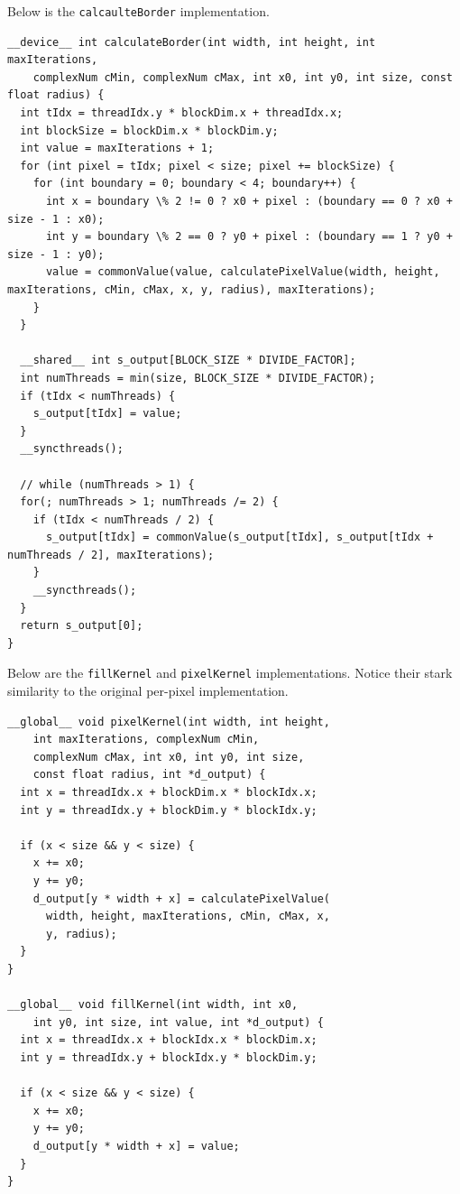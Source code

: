 \documentclass[letterpaper]{article}
\begin{document}
\begin{multicols}{2}
Below is the \texttt{calcaulteBorder} implementation.

\begin{lstlisting}
__device__ int calculateBorder(int width, int height, int maxIterations,
    complexNum cMin, complexNum cMax, int x0, int y0, int size, const float radius) {
  int tIdx = threadIdx.y * blockDim.x + threadIdx.x;
  int blockSize = blockDim.x * blockDim.y;
  int value = maxIterations + 1;
  for (int pixel = tIdx; pixel < size; pixel += blockSize) {
    for (int boundary = 0; boundary < 4; boundary++) {
      int x = boundary \% 2 != 0 ? x0 + pixel : (boundary == 0 ? x0 + size - 1 : x0); 
      int y = boundary \% 2 == 0 ? y0 + pixel : (boundary == 1 ? y0 + size - 1 : y0);
      value = commonValue(value, calculatePixelValue(width, height, maxIterations, cMin, cMax, x, y, radius), maxIterations);
    }
  }

  __shared__ int s_output[BLOCK_SIZE * DIVIDE_FACTOR];
  int numThreads = min(size, BLOCK_SIZE * DIVIDE_FACTOR);
  if (tIdx < numThreads) {
    s_output[tIdx] = value;
  }
  __syncthreads();

  // while (numThreads > 1) {
  for(; numThreads > 1; numThreads /= 2) {
    if (tIdx < numThreads / 2) {
      s_output[tIdx] = commonValue(s_output[tIdx], s_output[tIdx + numThreads / 2], maxIterations);
    }
    __syncthreads();
  }
  return s_output[0];
}
\end{lstlisting}

Below are the \texttt{fillKernel} and \texttt{pixelKernel} implementations.
  Notice their stark similarity to the original per-pixel implementation.

\begin{lstlisting}
__global__ void pixelKernel(int width, int height, 
    int maxIterations, complexNum cMin, 
    complexNum cMax, int x0, int y0, int size, 
    const float radius, int *d_output) {
  int x = threadIdx.x + blockDim.x * blockIdx.x;
  int y = threadIdx.y + blockDim.y * blockIdx.y;

  if (x < size && y < size) {
    x += x0;
    y += y0;
    d_output[y * width + x] = calculatePixelValue(
      width, height, maxIterations, cMin, cMax, x, 
      y, radius);
  }
}

__global__ void fillKernel(int width, int x0, 
    int y0, int size, int value, int *d_output) {
  int x = threadIdx.x + blockIdx.x * blockDim.x;
  int y = threadIdx.y + blockIdx.y * blockDim.y;

  if (x < size && y < size) {
    x += x0;
    y += y0;
    d_output[y * width + x] = value;
  }
}
\end{lstlisting}


\end{multicols}
\end{document}
